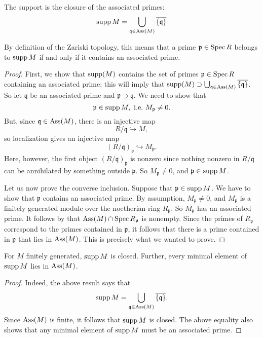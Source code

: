 \begin{proposition}\label{supportassociated} The support is the closure of the associated primes:
\[ \operatorname{supp} M  = \bigcup_{\mathfrak{q} \in \operatorname{Ass}(M)}
\overline{\left\{\mathfrak{q}\right\}} \]
\end{proposition} 

By definition of the Zariski topology, this means that a prime $\mathfrak{p}
\in \operatorname{Spec} R$ belongs to $\operatorname{supp} M$ if and only if it contains an associated
prime. 

\begin{proof} 
First,  we show that $\operatorname{supp}(M)$ contains the set of primes
$\mathfrak{p} \in \operatorname{Spec} R$ containing an associated prime; this will imply
that $\operatorname{supp}(M) \supset \bigcup_{\mathfrak{q} \in \operatorname{Ass}(M)}
\overline{\left\{\mathfrak{q}\right\}}$. So let $\mathfrak{q}$ be an
associated prime and $\mathfrak{p} \supset \mathfrak{q}$. We need to show that
\[ \mathfrak{p} \in \operatorname{supp} M, \ \text{i.e.} \ M_{\mathfrak{p}} \neq 0.  \]
But, since $\mathfrak{q} \in \operatorname{Ass}(M)$,  there is an injective map
\[ R/\mathfrak{q} \hookrightarrow M , \]
so localization gives an injective map
\[ (R/\mathfrak{q})_{\mathfrak{p}} \hookrightarrow M_{\mathfrak{p}}.  \]
Here, however, the first object $(R/\mathfrak{q})_{\mathfrak{p}}$ is nonzero since nothing nonzero in $R/\mathfrak{q}$ can be
annihilated by something outside $\mathfrak{p}$. So $M_{\mathfrak{p}} \neq
0$, and $\mathfrak{p} \in \operatorname{supp} M$. 

Let us now prove the converse inclusion. Suppose that $\mathfrak{p} \in \operatorname{supp} M$. We
have to show that $\mathfrak{p}$ contains an associated prime.  
By assumption, $M_{\mathfrak{p}} \neq 0$, and $M_{\mathfrak{p}}$ is a finitely generated
module over the noetherian ring $R_{\mathfrak{p}}$. So $M_{\mathfrak{p}}$ has
an associated prime.
It follows by  that $\operatorname{Ass}(M) \cap \operatorname{Spec}
R_{\mathfrak{p}}$ is nonempty. Since the primes of $R_{\mathfrak{p}}$
correspond to the primes contained in $\mathfrak{p}$, it follows that there
is  a prime contained in $\mathfrak{p}$ that lies in $\operatorname{Ass}(M)$. This is
precisely what we wanted to prove.
\end{proof} 


\begin{corollary} \label{suppisclosed} For $M$ finitely generated,  
$\operatorname{supp} M$ is closed. Further, every minimal element of $\operatorname{supp} M$ lies in
$\operatorname{Ass}(M)$.
\end{corollary} 
\begin{proof} 
Indeed, the above result says that
\[ \operatorname{supp} M  = \bigcup_{\mathfrak{q} \in \operatorname{Ass}(M)}
\overline{\left\{\mathfrak{q}\right\}}. \]
Since $\operatorname{Ass}(M)$ is finite, it follows that $\operatorname{supp} M$ is closed.
The above equality also shows that any minimal element of $\operatorname{supp} M$ must be an
associated prime.
\end{proof} 

